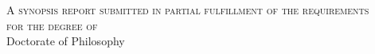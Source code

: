 \documentclass[a4paper, 11pt]{article}
\begin{document}
\begin{titlepage}
\begin {center}
\vspace*{0.4cm}

{
\Huge \par}


\vspace {.7in}
{\scshape  A synopsis report submitted in partial fulfillment of the requirements}\\
{\scshape for the degree of}\\
\sf
\vspace {0.4in}
{\large Doctorate of Philosophy}\\


\end{center}
\end{titlepage}
\end{document}
